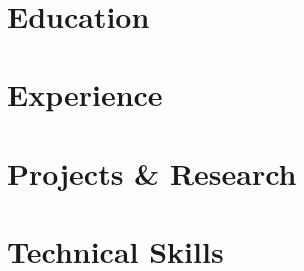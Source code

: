 \documentclass[letterpaper,11pt]{article}
\begin{document}
\begin{center}
  \textbf{\Huge \scshape
  } \\ \vspace{1pt}
  \small
\end{center}

\section{Education}

\section{Experience}

\section{Projects \& Research}

\section{Technical Skills}
\end{document}
